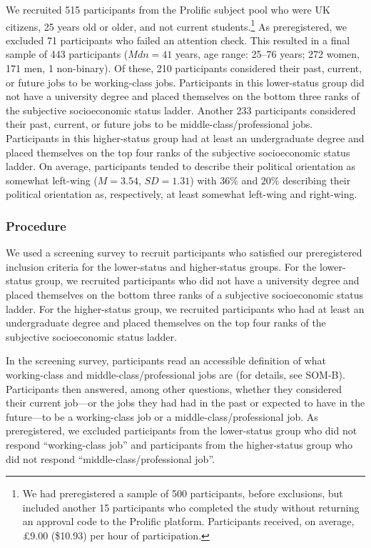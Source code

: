 \documentclass[12pt, letterpaper]{article}
\begin{document}
We recruited 515 participants from the Prolific subject pool who were UK
citizens, 25 years old or older, and not current students.\footnote{We
  had preregistered a sample of 500 participants, before exclusions, but
  included another 15 participants who completed the study without
  returning an approval code to the Prolific platform. Participants
  received, on average, \pounds 9.00 (\$10.93) per hour of
  participation.} As preregistered, we excluded 71 participants who
failed an attention check. This resulted in a final sample of 443
participants (\(\textit{Mdn} = 41\) years, age range: 25--76 years; 272
women, 171 men, 1 non-binary). Of these, 210 participants considered
their past, current, or future jobs to be working-class jobs.
Participants in this lower-status group did not have a university degree
and placed themselves on the bottom three ranks of the subjective
socioeconomic status ladder. Another 233 participants considered their
past, current, or future jobs to be middle-class/professional jobs.
Participants in this higher-status group had at least an undergraduate
degree and placed themselves on the top four ranks of the subjective
socioeconomic status ladder. On average, participants tended to describe
their political orientation as somewhat left-wing
(\(\textit{M} = 3.54\), \(\textit{SD} = 1.31\)) with \(36\%\) and
\(20\%\) describing their political orientation as, respectively, at
least somewhat left-wing and right-wing.

\hypertarget{procedure}{%
\subsubsection{Procedure}\label{procedure}}

We used a screening survey to recruit participants who satisfied our
preregistered inclusion criteria for the lower-status and higher-status
groups. For the lower-status group, we recruited participants who did
not have a university degree and placed themselves on the bottom three
ranks of a subjective socioeconomic status ladder. For the higher-status
group, we recruited participants who had at least an undergraduate
degree and placed themselves on the top four ranks of the subjective
socioeconomic status ladder.

In the screening survey, participants read an accessible definition of
what working-class and middle-class/professional jobs are (for details,
see SOM-B). Participants then answered, among other questions, whether
they considered their current job---or the jobs they had had in the past
or expected to have in the future---to be a working-class job or a
middle-class/professional job. As preregistered, we excluded
participants from the lower-status group who did not respond
``working-class job'' and participants from the higher-status group who
did not respond ``middle-class/professional job''.
\end{document}
